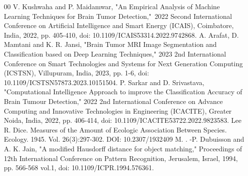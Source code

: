 \documentclass[conference]{IEEEtran}
\begin{document}
\begin{thebibliography}{00}
V. Kushwaha and P. Maidamwar, "An Empirical Analysis of Machine Learning Techniques for Brain Tumor Detection," 2022 Second International Conference on Artificial Intelligence and Smart Energy (ICAIS), Coimbatore, India, 2022, pp. 405-410, doi: 10.1109/ICAIS53314.2022.9742868.
A. Arafat, D. Mamtani and K. R. Jansi, "Brain Tumor MRI Image Segmentation and Classification based on Deep Learning Techniques," 2023 2nd International Conference on Smart Technologies and Systems for Next Generation Computing (ICSTSN), Villupuram, India, 2023, pp. 1-6, doi: 10.1109/ICSTSN57873.2023.10151504.
P. Sarkar and D. Srivastava, "Computational Intelligence Approach to improve the Classification Accuracy of Brain Tumour Detection," 2022 2nd International Conference on Advance Computing and Innovative Technologies in Engineering (ICACITE), Greater Noida, India, 2022, pp. 406-414, doi: 10.1109/ICACITE53722.2022.9823583.
Lee R. Dice. Measures of the Amount of Ecologic Association Between Species. Ecology. 1945. Vol. 26(3):297-302. DOI: 10.2307/1932409
M. . -P. Dubuisson and A. K. Jain, "A modified Hausdorff distance for object matching," Proceedings of 12th International Conference on Pattern Recognition, Jerusalem, Israel, 1994, pp. 566-568 vol.1, doi: 10.1109/ICPR.1994.576361.
\end{thebibliography}
\vspace{12pt}
\color{red}
\end{document}
